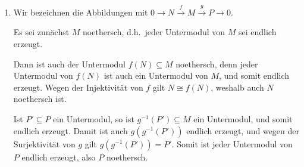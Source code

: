 \begin{question}
  \begin{enumerate}
    \item
      Wir bezeichnen die Abbildungen mit $0 \to N \xrightarrow{f} M \xrightarrow{g} P \to 0$.
      
      Es sei zunächst $M$ noethersch, d.h.\ jeder Untermodul von $M$ sei endlich erzeugt.
      
      Dann ist auch der Untermodul $f(N) \subseteq M$ noethersch, denn jeder Untermodul von $f(N)$ ist auch ein Untermodul von $M$, und somit endlich erzeugt.
      Wegen der Injektivität von $f$ gilt $N \cong f(N)$, weshalb auch $N$ noethersch ist.
      
      Ist $P' \subseteq P$ ein Untermodul, so ist $g^{-1}(P') \subseteq M$ ein Untermodul, und somit endlich erzeugt.
      Damit ist auch $g(g^{-1}(P'))$ endlich erzeugt, und wegen der Surjektivität von $g$ gilt $g(g^{-1}(P')) = P'$.
      Somit ist jeder Untermodul von $P$ endlich erzeugt, also $P$ noethersch.
      

\end{enumerate}
\end{question}
